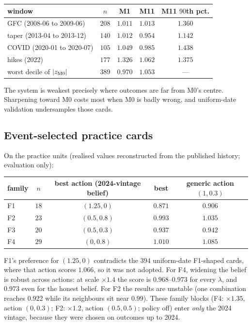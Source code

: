 \begin{center}
\begin{tabular}{lcccc}
\toprule
window & $n$ & M1 & M11 & M11 $90$th pct.\\
\midrule
GFC (2008-06 to 2009-06) & $208$ & $1.011$ & $1.013$ & $1.360$\\
taper (2013-04 to 2013-12) & $140$ & $1.012$ & $0.954$ & $1.142$\\
COVID (2020-01 to 2020-07) & $105$ & $1.049$ & $0.985$ & $1.438$\\
hikes (2022) & $177$ & $1.326$ & $1.062$ & $1.375$\\
worst decile of $|z_{\mathrm{M0}}|$ & $389$ & $0.970$ & $1.053$ & ---\\
\bottomrule
\end{tabular}
\end{center}
The system is weakest precisely where outcomes are far from M0's centre. Sharpening toward M0 costs most when M0 is badly wrong, and uniform-date
validation undersamples those cards.

\subsection{Event-selected practice cards}

On the practice units (realised values reconstructed from the published history; evaluation only):
\begin{center}
\begin{tabular}{lcccc}
\toprule
family & $n$ & best action (2024-vintage belief) & best & generic action $(1,0.3)$\\
\midrule
F1 & $18$ & $(1.25,0)$ & $0.871$ & $0.906$\\
F2 & $23$ & $(0.5,0.8)$ & $0.993$ & $1.035$\\
F3 & $20$ & $(0.5,0.3)$ & $0.937$ & $0.942$\\
F4 & $29$ & $(0,0.8)$ & $1.010$ & $1.085$\\
\bottomrule
\end{tabular}
\end{center}
F1's preference for $(1.25,0)$ contradicts the $394$ uniform-date F1-shaped cards, where that action scores $1.066$, so it was not adopted. For
F4, widening the belief is robust across actions: at scale $\times1.4$ the score is $0.968$--$0.973$ for every $\lambda$, and $0.973$ even for the
honest belief. For F2 the results are unstable (one combination reaches $0.922$ while its neighbours sit near $0.99$). These family blocks
(F4: $\times1.35$, action $(0,0.3)$; F2: $\times1.2$, action $(0.5,0.5)$; policy off) enter \emph{only} the 2024 vintage, because they were chosen
on outcomes up to 2024.

